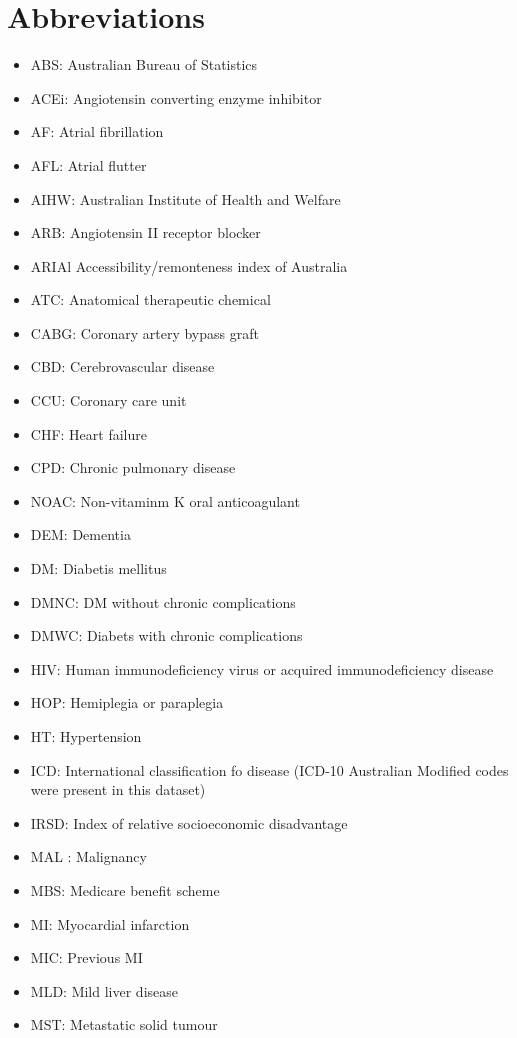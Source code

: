 \documentclass[11pt]{article}
\begin{document}
\section{Abbreviations}

\begin{itemize}
\item ABS: Australian Bureau of Statistics
\item ACEi: Angiotensin converting enzyme inhibitor
\item AF: Atrial fibrillation
\item AFL: Atrial flutter
\item AIHW: Australian Institute of Health and Welfare
\item ARB: Angiotensin II receptor blocker
\item ARIAl Accessibility/remonteness index of Australia
\item ATC: Anatomical therapeutic chemical
\item CABG: Coronary artery bypass graft
\item CBD: Cerebrovascular disease 
\item CCU: Coronary care unit
\item CHF: Heart failure
\item CPD: Chronic pulmonary disease
\item NOAC: Non-vitaminm K oral anticoagulant
\item DEM: Dementia
\item DM: Diabetis mellitus
\item DMNC: DM without chronic complications
\item DMWC: Diabets with chronic complications
\item HIV: Human immunodeficiency virus or acquired immunodeficiency disease
\item HOP: Hemiplegia or paraplegia
\item HT: Hypertension
\item ICD: International classification fo disease (ICD-10 Australian Modified codes were present in this dataset)
\item IRSD: Index of relative socioeconomic disadvantage
\item MAL : Malignancy
\item MBS: Medicare benefit scheme
\item MI: Myocardial infarction
\item MIC: Previous MI
\item MLD: Mild liver disease
\item MST: Metastatic solid tumour

\end{itemize}
\end{document}

